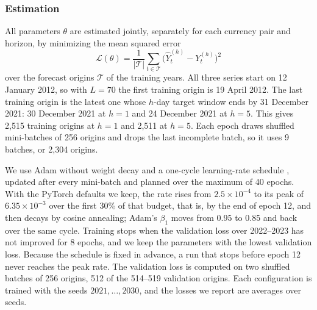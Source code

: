 \subsubsection{Estimation}
\label{sec:filmtcn-estimation}

All parameters $\theta$ are estimated jointly, separately for each currency
pair and horizon, by minimizing the mean squared error
\begin{equation}
  \mathcal{L}(\theta)
  = \frac{1}{|\mathcal{T}|}\sum_{t\in\mathcal{T}}
    \bigl(\hat{Y}^{(h)}_t - Y^{(h)}_t\bigr)^2
  \label{eq:filmtcn-loss}
\end{equation}
over the forecast origins $\mathcal{T}$ of the training years. All three series
start on 12 January 2012, so with $L=70$ the first training origin is
19 April 2012. The last training origin is the latest one whose $h$-day target
window ends by 31 December 2021: 30 December 2021 at $h=1$ and 24 December 2021
at $h=5$. This gives 2,515 training origins at $h=1$ and 2,511 at $h=5$. Each epoch draws shuffled mini-batches of 256 origins
and drops the last incomplete batch, so it uses 9 batches, or 2,304 origins.

We use Adam \citep{kingma2015adam} without weight decay and a one-cycle
learning-rate schedule \citep{smith2019superconvergence}, updated after every
mini-batch and planned over the maximum of 40 epochs. With the PyTorch defaults
we keep, the rate rises from $2.5\times10^{-4}$ to its peak of
$6.35\times10^{-3}$ over the first 30\% of that budget, that is, by the end of
epoch 12, and then decays by cosine annealing; Adam's $\beta_1$ moves from 0.95
to 0.85 and back over the same cycle. Training stops when the validation loss
over 2022--2023 has not improved for 8 epochs, and we keep the parameters with
the lowest validation loss. Because the schedule is fixed in advance, a run
that stops before epoch 12 never reaches the peak rate. The validation loss is
computed on two shuffled batches of 256 origins, 512 of the 514--519
validation origins. Each configuration is trained with the seeds
$2021,\dots,2030$, and the losses we report are averages over seeds.

